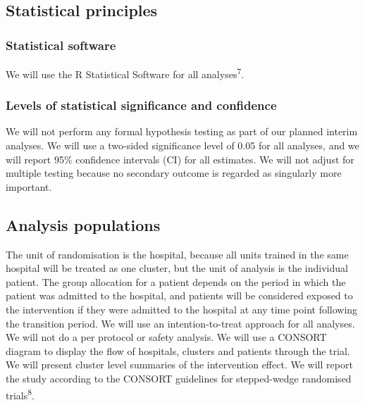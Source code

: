 \documentclass[
]{scrartcl}
\begin{document}
\hypertarget{statistical-principles}{%
\subsection{Statistical principles}\label{statistical-principles}}

\hypertarget{statistical-software}{%
\subsubsection{Statistical software}\label{statistical-software}}

We will use the R Statistical Software for all
analyses\textsuperscript{7}.

\hypertarget{levels-of-statistical-significance-and-confidence}{%
\subsubsection{Levels of statistical significance and
confidence}\label{levels-of-statistical-significance-and-confidence}}

We will not perform any formal hypothesis testing as part of our planned
interim analyses. We will use a two-sided significance level of 0.05 for
all analyses, and we will report 95\% confidence intervals (CI) for all
estimates. We will not adjust for multiple testing because no secondary
outcome is regarded as singularly more important.

\hypertarget{analysis-populations}{%
\subsection{Analysis populations}\label{analysis-populations}}

The unit of randomisation is the hospital, because all units trained in
the same hospital will be treated as one cluster, but the unit of
analysis is the individual patient. The group allocation for a patient
depends on the period in which the patient was admitted to the hospital,
and patients will be considered exposed to the intervention if they were
admitted to the hospital at any time point following the transition
period. We will use an intention-to-treat approach for all analyses. We
will not do a per protocol or safety analysis. We will use a CONSORT
diagram to display the flow of hospitals, clusters and patients through
the trial. We will present cluster level summaries of the intervention
effect. We will report the study according to the CONSORT guidelines for
stepped-wedge randomised trials\textsuperscript{8}.
\end{document}
